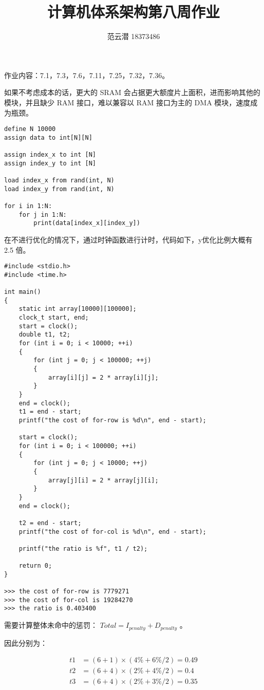 \documentclass[lang=cn,11pt,a4paper,cite=authoryear,twocolumn]{elegantpaper}
\title{计算机体系架构\quad 第八周作业}
\author{范云潜 18373486}
\institute{微电子学院 184111 班}
\date{\zhtoday}
\begin{document}
\maketitle

作业内容：7.1，7.3，7.6，7.11，7.25，7.32，7.36。


如果不考虑成本的话，更大的 SRAM 会占据更大额度片上面积，进而影响其他的模块，并且缺少 RAM 接口，难以兼容以 RAM 接口为主的 DMA 模块，速度成为瓶颈。


\begin{lstlisting}
define N 10000
assign data to int[N][N]

assign index_x to int [N] 
assign index_y to int [N]

load index_x from rand(int, N)
load index_y from rand(int, N)

for i in 1:N:
    for j in 1:N:
        print(data[index_x][index_y]) 
\end{lstlisting}



在不进行优化的情况下，通过时钟函数进行计时，代码如下，y优化比例大概有 2.5 倍。

\begin{lstlisting}
#include <stdio.h>
#include <time.h>

int main()
{
    static int array[10000][100000];
    clock_t start, end;
    start = clock();
    double t1, t2;
    for (int i = 0; i < 10000; ++i)
    {
        for (int j = 0; j < 100000; ++j)
        {
            array[i][j] = 2 * array[i][j];
        }
    }
    end = clock();
    t1 = end - start;
    printf("the cost of for-row is %d\n", end - start);

    start = clock();
    for (int i = 0; i < 100000; ++i)
    {
        for (int j = 0; j < 10000; ++j)
        {
            array[j][i] = 2 * array[j][i];
        }
    }
    end = clock();

    t2 = end - start;
    printf("the cost of for-col is %d\n", end - start);

    printf("the ratio is %f", t1 / t2);

    return 0;
}

>>> the cost of for-row is 7779271
>>> the cost of for-col is 19284270
>>> the ratio is 0.403400                
\end{lstlisting}



需要计算整体未命中的惩罚： \(Total = I_{penalty} + D_{penalty}\) 。

因此分别为：

\[\begin{aligned}
    t1 &= (6 + 1) \times (4\% + 6\% / 2) = 0.49 \\
    t2 &= (6 + 4) \times (2\% + 4\% / 2) = 0.4 \\ 
    t3 &= (6 + 4) \times (2\% + 3\% / 2) = 0.35
\end{aligned}\]


\end{document}
